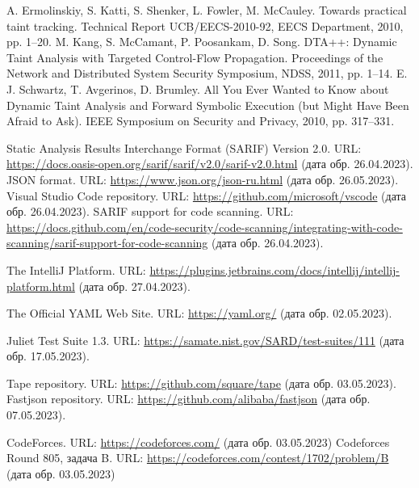 \documentclass[a4paper,article,14pt]{extarticle}
\begin{document}
\begin{thebibliography}{1}
 A. Ermolinskiy, S. Katti, S. Shenker, L. Fowler, M. McCauley. Towards practical taint tracking. Technical Report
UCB/EECS-2010-92, EECS Department, 2010, pp. 1–20.
 M. Kang, S. McCamant, P. Poosankam, D. Song. DTA++: Dynamic Taint Analysis with Targeted Control-Flow Propagation. Proceedings of the Network and Distributed System Security Symposium, NDSS, 2011, pp. 1–14.
 E. J. Schwartz, T. Avgerinos, D. Brumley. All You Ever Wanted to Know about Dynamic Taint Analysis and Forward Symbolic Execution (but Might Have Been Afraid to Ask). IEEE Symposium on Security and Privacy, 2010, pp. 317–331.


 Static Analysis Results Interchange Format (SARIF) Version 2.0. URL: \url{https://docs.oasis-open.org/sarif/sarif/v2.0/sarif-v2.0.html} (дата обр. 26.04.2023).
 JSON format. URL: \url{https://www.json.org/json-ru.html} (дата обр. 26.05.2023).
 Visual Studio Code repository. URL: \url{https://github.com/microsoft/vscode} (дата обр. 26.04.2023).
 SARIF support for code scanning. URL: \url{https://docs.github.com/en/code-security/code-scanning/integrating-with-code-scanning/sarif-support-for-code-scanning} (дата обр. 26.04.2023).


 The IntelliJ Platform. URL: \url{https://plugins.jetbrains.com/docs/intellij/intellij-platform.html} (дата обр. 27.04.2023).


 The Official YAML Web Site. URL: \url{https://yaml.org/} (дата обр. 02.05.2023).


 Juliet Test Suite 1.3. URL: \url{https://samate.nist.gov/SARD/test-suites/111} (дата обр. 17.05.2023).

 Tape repository. URL: \url{https://github.com/square/tape} (дата обр. 03.05.2023).
 Fastjson repository. URL: \url{https://github.com/alibaba/fastjson} (дата обр. 07.05.2023).

 CodeForces. URL: \url{https://codeforces.com/} (дата обр. 03.05.2023)
 Codeforces Round 805, задача B. URL: \url{https://codeforces.com/contest/1702/problem/B} (дата обр. 03.05.2023)
\end{thebibliography}


\end{document}
